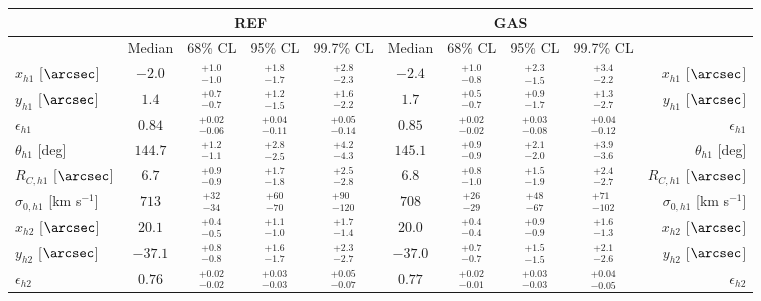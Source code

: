 \documentclass[twocolumn]{aastex61}
\begin{document}
\renewcommand{\arraystretch}{1.3}

\begin{table}
\centering
\begin{tabular}{l*{4}{c}*{4}{c}r}

\hline
\hline
 & \multicolumn{4}{c}{REF} & \multicolumn{4}{c}{GAS} & \\
\hline
 & Median & 68\% CL & 95\% CL & 99.7\% CL & Median & 68\% CL & 95\% CL & 99.7\% CL & \\
\hline

$x_{h1}$ [$\arcsec$] & $-2.0$ & $^{ +1.0 } _{ -1.0 }$ & $^{ +1.8 } _{ -1.7 }$ & $^{ +2.8 } _{ -2.3 }$ & $-2.4$ & $^{ +1.0 } _{ -0.8 }$ & $^{ +2.3 } _{ -1.5 }$ & $^{ +3.4 } _{ -2.2 }$ & $x_{h1}$ [$\arcsec$] \\
$y_{h1}$ [$\arcsec$] & $1.4$ & $^{ +0.7 } _{ -0.7 }$ & $^{ +1.2 } _{ -1.5 }$ & $^{ +1.6 } _{ -2.2 }$ & $1.7$ & $^{ +0.5 } _{ -0.7 }$ & $^{ +0.9 } _{ -1.7 }$ & $^{ +1.3 } _{ -2.7 }$ & $y_{h1}$ [$\arcsec$] \\
$\epsilon_{h1}$ & $0.84$ & $^{ +0.02 } _{ -0.06 }$ & $^{ +0.04 } _{ -0.11 }$ & $^{ +0.05 } _{ -0.14 }$ & $0.85$ & $^{ +0.02 } _{ -0.02 }$ & $^{ +0.03 } _{ -0.08 }$ & $^{ +0.04 } _{ -0.12 }$ & $\epsilon_{h1}$ \\
$\theta_{h1}$ [deg] & $144.7$ & $^{ +1.2 } _{ -1.1 }$ & $^{ +2.8 } _{ -2.5 }$ & $^{ +4.2 } _{ -4.3 }$ & $145.1$ & $^{ +0.9 } _{ -0.9 }$ & $^{ +2.1 } _{ -2.0 }$ & $^{ +3.9 } _{ -3.6 }$ & $\theta_{h1}$ [deg] \\
$R_{C,h1}$ [$\arcsec$] & $6.7$ & $^{ +0.9 } _{ -0.9 }$ & $^{ +1.7 } _{ -1.8 }$ & $^{ +2.5 } _{ -2.8 }$ & $6.8$ & $^{ +0.8 } _{ -1.0 }$ & $^{ +1.5 } _{ -1.9 }$ & $^{ +2.4 } _{ -2.7 }$ & $R_{C,h1}$ [$\arcsec$] \\
$\sigma_{0,h1}$ [km s$^{-1}$] & $713$ & $^{ +32 } _{ -34 }$ & $^{ +60 } _{ -70 }$ & $^{ +90 } _{ -120 }$ & $708$ & $^{ +26 } _{ -29 }$ & $^{ +48 } _{ -67 }$ & $^{ +71 } _{ -102 }$ & $\sigma_{0,h1}$ [km s$^{-1}$] \\
$x_{h2}$ [$\arcsec$] & $20.1$ & $^{ +0.4 } _{ -0.5 }$ & $^{ +1.1 } _{ -1.0 }$ & $^{ +1.7 } _{ -1.4 }$ & $20.0$ & $^{ +0.4 } _{ -0.4 }$ & $^{ +0.9 } _{ -0.9 }$ & $^{ +1.6 } _{ -1.3 }$ & $x_{h2}$ [$\arcsec$] \\
$y_{h2}$ [$\arcsec$] & $-37.1$ & $^{ +0.8 } _{ -0.8 }$ & $^{ +1.6 } _{ -1.7 }$ & $^{ +2.3 } _{ -2.7 }$ & $-37.0$ & $^{ +0.7 } _{ -0.7 }$ & $^{ +1.5 } _{ -1.5 }$ & $^{ +2.1 } _{ -2.6 }$ & $y_{h2}$ [$\arcsec$] \\
$\epsilon_{h2}$ & $0.76$ & $^{ +0.02 } _{ -0.02 }$ & $^{ +0.03 } _{ -0.03 }$ & $^{ +0.05 } _{ -0.07 }$ & $0.77$ & $^{ +0.02 } _{ -0.01 }$ & $^{ +0.03 } _{ -0.03 }$ & $^{ +0.04 } _{ -0.05 }$ & $\epsilon_{h2}$ \\

\end{tabular}
\end{table}
\end{document}
